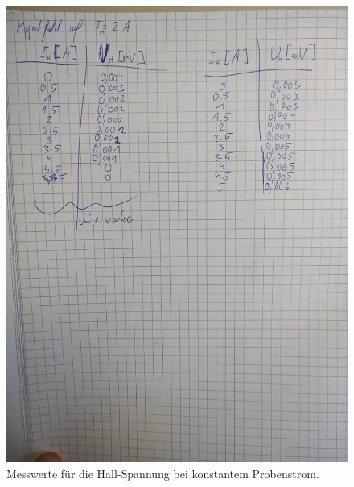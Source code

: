 \begin{figure}
 \centering
 \caption{Messwerte für die Hall-Spannung bei konstantem Probenstrom.}
 \includegraphics[width=\textwidth]{hallwerte2.jpeg}
\end{figure}